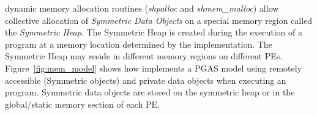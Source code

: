 \openshmem dynamic memory allocation routines (\textit{shpalloc} and
\textit{shmem\_malloc}) allow collective allocation of \emph{Symmetric Data
Objects} on a special memory region called the \emph{Symmetric Heap}. The
Symmetric Heap is created during the execution of a program at a memory location
determined by the implementation. The Symmetric Heap may reside in different
memory regions on different \acp{PE}. Figure~\ref{fig:mem_model} shows how
\openshmem implements a \ac{PGAS} model using remotely accessible (Symmetric
objects) and private data objects when executing an \openshmem program.
Symmetric data objects are stored on the symmetric heap or in the global/static
memory section of each \ac{PE}. 
